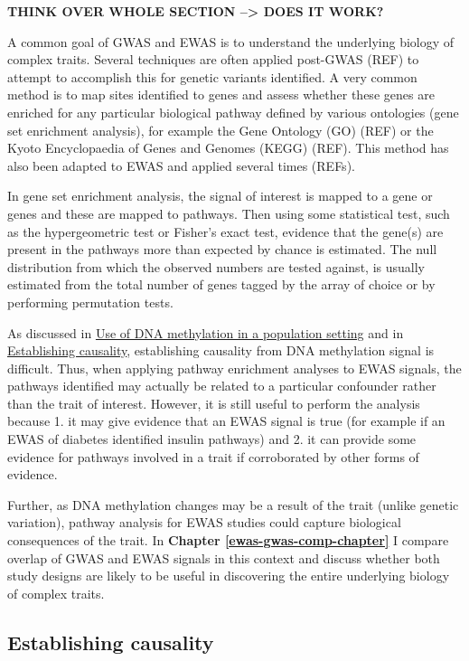 \documentclass[11pt,twoside]{bristolthesis}
\begin{document}
\textbf{THINK OVER WHOLE SECTION --\textgreater{} DOES IT WORK?}

A common goal of GWAS and EWAS is to understand the underlying biology of complex traits. Several techniques are often applied post-GWAS (REF) to attempt to accomplish this for genetic variants identified. A very common method is to map sites identified to genes and assess whether these genes are enriched for any particular biological pathway defined by various ontologies (gene set enrichment analysis), for example the Gene Ontology (GO) (REF) or the Kyoto Encyclopaedia of Genes and Genomes (KEGG) (REF). This method has also been adapted to EWAS and applied several times (REFs).

In gene set enrichment analysis, the signal of interest is mapped to a gene or genes and these are mapped to pathways. Then using some statistical test, such as the hypergeometric test or Fisher's exact test, evidence that the gene(s) are present in the pathways more than expected by chance is estimated. The null distribution from which the observed numbers are tested against, is usually estimated from the total number of genes tagged by the array of choice or by performing permutation tests.

As discussed in \protect\hyperlink{dnam-phs}{Use of DNA methylation in a population setting} and in \protect\hyperlink{establishing-causality}{Establishing causality}, establishing causality from DNA methylation signal is difficult. Thus, when applying pathway enrichment analyses to EWAS signals, the pathways identified may actually be related to a particular confounder rather than the trait of interest. However, it is still useful to perform the analysis because 1. it may give evidence that an EWAS signal is true (for example if an EWAS of diabetes identified insulin pathways) and 2. it can provide some evidence for pathways involved in a trait if corroborated by other forms of evidence.

Further, as DNA methylation changes may be a result of the trait (unlike genetic variation), pathway analysis for EWAS studies could capture biological consequences of the trait. In \textbf{Chapter \ref{ewas-gwas-comp-chapter}} I compare overlap of GWAS and EWAS signals in this context and discuss whether both study designs are likely to be useful in discovering the entire underlying biology of complex traits.

\hypertarget{establishing-causality}{%
\subsection{Establishing causality}\label{establishing-causality}}
\end{document}
